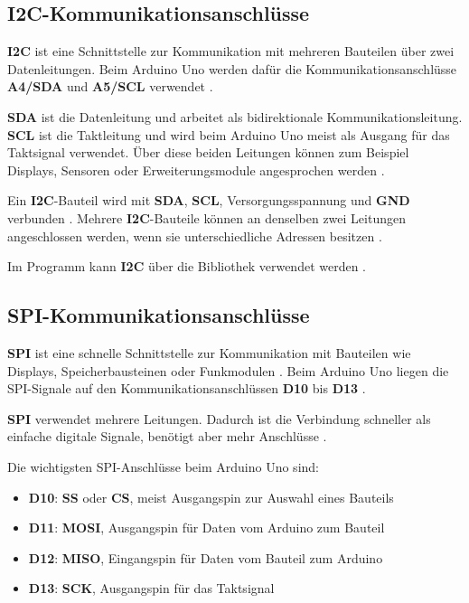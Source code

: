 \subsection{I2C-Kommunikationsanschlüsse}



\textbf{I2C} ist eine Schnittstelle zur Kommunikation mit mehreren Bauteilen über zwei Datenleitungen. Beim Arduino Uno werden dafür die Kommunikationsanschlüsse \textbf{A4/SDA} und \textbf{A5/SCL} verwendet \cite{arduino:uno-datasheet}.

\textbf{SDA} ist die Datenleitung und arbeitet als bidirektionale Kommunikationsleitung. \textbf{SCL} ist die Taktleitung und wird beim Arduino Uno meist als Ausgang für das Taktsignal verwendet. Über diese beiden Leitungen können zum Beispiel Displays, Sensoren oder Erweiterungsmodule angesprochen werden \cite{arduino:language-reference}.



Ein \textbf{I2C}-Bauteil wird mit \textbf{SDA}, \textbf{SCL}, Versorgungsspannung und \textbf{GND} verbunden \cite{arduino:uno-datasheet}. Mehrere \textbf{I2C}-Bauteile können an denselben zwei Leitungen angeschlossen werden, wenn sie unterschiedliche Adressen besitzen \cite{arduino:language-reference}.

Im Programm kann \textbf{I2C} über die Bibliothek  verwendet werden \cite{arduino:language-reference}.



\subsection{SPI-Kommunikationsanschlüsse}


\textbf{SPI} ist eine schnelle Schnittstelle zur Kommunikation mit Bauteilen wie Displays, Speicherbausteinen oder Funkmodulen \cite{arduino:language-reference}. Beim Arduino Uno liegen die SPI-Signale auf den Kommunikationsanschlüssen \textbf{D10} bis \textbf{D13} \cite{arduino:uno-datasheet}.

\textbf{SPI} verwendet mehrere Leitungen. Dadurch ist die Verbindung schneller als einfache digitale Signale, benötigt aber mehr Anschlüsse \cite{arduino:language-reference}.



Die wichtigsten SPI-Anschlüsse beim Arduino Uno sind:
\begin{itemize}
	\item \textbf{D10}: \textbf{SS} oder \textbf{CS}, meist Ausgangspin zur Auswahl eines Bauteils
	\item \textbf{D11}: \textbf{MOSI}, Ausgangspin für Daten vom Arduino zum Bauteil
	\item \textbf{D12}: \textbf{MISO}, Eingangspin für Daten vom Bauteil zum Arduino
	\item \textbf{D13}: \textbf{SCK}, Ausgangspin für das Taktsignal \cite{arduino:uno-datasheet}
\end{itemize}

